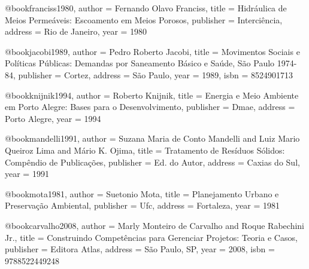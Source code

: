 @book{franciss1980,
  author = {Fernando Olavo Franciss},
  title = {Hidráulica de Meios Permeáveis: Escoamento em Meios Porosos},
  publisher = {Interciência},
  address = {Rio de Janeiro},
  year = {1980}
}

@book{jacobi1989,
  author = {Pedro Roberto Jacobi},
  title = {Movimentos Sociais e Políticas Públicas: Demandas por Saneamento Básico e Saúde, São Paulo 1974-84},
  publisher = {Cortez},
  address = {São Paulo},
  year = {1989},
  isbn = {8524901713}
}

@book{knijnik1994,
  author = {Roberto Knijnik},
  title = {Energia e Meio Ambiente em Porto Alegre: Bases para o Desenvolvimento},
  publisher = {Dmae},
  address = {Porto Alegre},
  year = {1994}
}

@book{mandelli1991,
  author = {Suzana Maria de Conto Mandelli and Luiz Mario Queiroz Lima and Mário K. Ojima},
  title = {Tratamento de Resíduos Sólidos: Compêndio de Publicações},
  publisher = {Ed. do Autor},
  address = {Caxias do Sul},
  year = {1991}
}

@book{mota1981,
  author = {Suetonio Mota},
  title = {Planejamento Urbano e Preservação Ambiental},
  publisher = {Ufc},
  address = {Fortaleza},
  year = {1981}
}

%

@book{carvalho2008,
  author = {Marly Monteiro de Carvalho and Roque Rabechini Jr.},
  title = {Construindo Competências para Gerenciar Projetos: Teoria e Casos},
  publisher = {Editora Atlas},
  address = {São Paulo, SP},
  year = {2008},
  isbn = {9788522449248}
}

